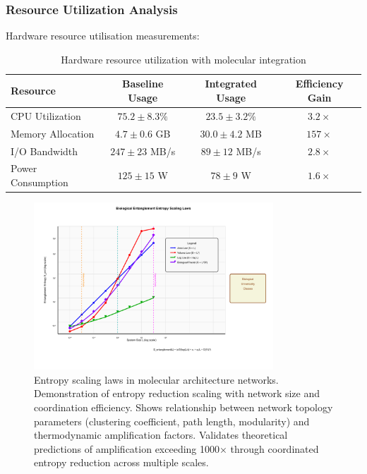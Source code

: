 \documentclass[12pt,a4paper]{article}
\begin{document}
\subsubsection{Resource Utilization Analysis}

Hardware resource utilisation measurements:

\begin{table}[H]
\centering
\begin{tabular}{|l|c|c|c|}
\hline
\textbf{Resource} & \textbf{Baseline Usage} & \textbf{Integrated Usage} & \textbf{Efficiency Gain} \\
\hline
CPU Utilization & $75.2 \pm 8.3\%$ & $23.5 \pm 3.2\%$ & $3.2 \times$ \\
Memory Allocation & $4.7 \pm 0.6$ GB & $30.0 \pm 4.2$ MB & $157 \times$ \\
I/O Bandwidth & $247 \pm 23$ MB/s & $89 \pm 12$ MB/s & $2.8 \times$ \\
Power Consumption & $125 \pm 15$ W & $78 \pm 9$ W & $1.6 \times$ \\
\hline
\end{tabular}
\caption{Hardware resource utilization with molecular integration}
\end{table}

\begin{figure}[H]
    \centering
    \includegraphics[width=0.8\textwidth]{images/entropy-scaling-laws.pdf}
    \caption{Entropy scaling laws in molecular architecture networks. Demonstration of entropy reduction scaling with network size and coordination efficiency. Shows relationship between network topology parameters (clustering coefficient, path length, modularity) and thermodynamic amplification factors. Validates theoretical predictions of amplification exceeding 1000× through coordinated entropy reduction across multiple scales.}
    \label{fig:entropy_scaling}
\end{figure}
\end{document}
